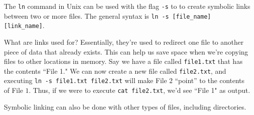 The \verb!ln! command in Unix can be used with the flag \verb!-s! to to create symbolic links between two or more files. The general syntax is \verb!ln -s [file_name] [link_name]!. 

What are links used for? Essentially, they're used to redirect one file to another piece of data that already exists. This can help us save space when we're copying files to other locations in memory. Say we have a file called \verb!file1.txt! that has the contents ``File 1." We can now create a new file called \verb!file2.txt!, and executing \verb!ln -s file1.txt file2.txt! will make File $2$ ``point'' to the contents of File $1$. Thus, if we were to execute \verb!cat file2.txt!, we'd see ``File 1" as output. 

Symbolic linking can also be done with other types of files, including directories.